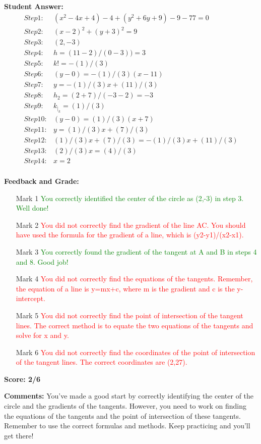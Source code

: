 \documentclass{article}
\begin{document}
\textbf{Student Answer:}
\begin{align*}
Step 1: & (x^{2}-4x+4)-4+(y^{2}+6y+9)-9-77=0 \\
Step 2: & (x-2)^{2}+(y+3)^{2}=9 \\
Step 3: & (2,-3) \\
Step 4: & h=(11-2)/(0-3))=3 \\
Step 5: & k!=-(1)/(3) \\
Step 6: & (y-0)=-(1)/(3)(x-11) \\
Step 7: & y=-(1)/(3)x+(11)/(3) \\
Step 8: & h_2=(2+7)/(-3-2)=-3 \\
Step 9: & k _|_ k=(1)/(3) \\
Step 10: & (y-0)=(1)/(3)(x+7) \\
Step 11: & y=(1)/(3)x+(7)/(3) \\
Step 12: & (1)/(3)x+(7)/(3)=-(1)/(3)x+(11)/(3) \\
Step 13: & (2)/(3)x=(4)/(3) \\
Step 14: & x=2 \\
\end{align*}

\textbf{Feedback and Grade:}
\begin{itemize}
\item[Mark 1] \textcolor{green}{You correctly identified the center of the circle as (2,-3) in step 3. Well done!}
\item[Mark 2] \textcolor{red}{You did not correctly find the gradient of the line AC. You should have used the formula for the gradient of a line, which is (y2-y1)/(x2-x1).}
\item[Mark 3] \textcolor{green}{You correctly found the gradient of the tangent at A and B in steps 4 and 8. Good job!}
\item[Mark 4] \textcolor{red}{You did not correctly find the equations of the tangents. Remember, the equation of a line is y=mx+c, where m is the gradient and c is the y-intercept.}
\item[Mark 5] \textcolor{red}{You did not correctly find the point of intersection of the tangent lines. The correct method is to equate the two equations of the tangents and solve for x and y.}
\item[Mark 6] \textcolor{red}{You did not correctly find the coordinates of the point of intersection of the tangent lines. The correct coordinates are (2,27).}
\end{itemize}

\textbf{Score: 2/6}

\textbf{Comments:} You've made a good start by correctly identifying the center of the circle and the gradients of the tangents. However, you need to work on finding the equations of the tangents and the point of intersection of these tangents. Remember to use the correct formulas and methods. Keep practicing and you'll get there!
\end{document}
